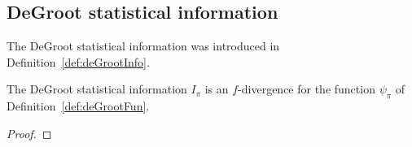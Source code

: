 \subsection{DeGroot statistical information}

The DeGroot statistical information was introduced in Definition~\ref{def:deGrootInfo}.

\begin{lemma}
  \label{lem:deGrootInfo_eq_fDiv}
  The DeGroot statistical information $I_\pi$ is an $f$-divergence for the function $\psi_\pi$ of Definition~\ref{def:deGrootFun}.
\end{lemma}

\begin{proof}%
\uses{}

\end{proof}
